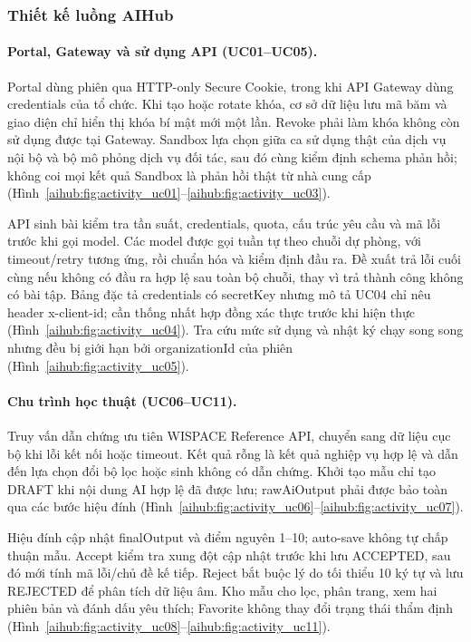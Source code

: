\subsubsection{Thiết kế luồng AIHub}

\paragraph{Portal, Gateway và sử dụng API (UC01--UC05).}
Portal dùng phiên qua HTTP-only Secure Cookie, trong khi API Gateway dùng credentials của tổ chức. Khi tạo hoặc rotate khóa, cơ sở dữ liệu lưu mã băm và giao diện chỉ hiển thị khóa bí mật mới một lần. Revoke phải làm khóa không còn sử dụng được tại Gateway. Sandbox lựa chọn giữa ca sử dụng thật của dịch vụ nội bộ và bộ mô phỏng dịch vụ đối tác, sau đó cùng kiểm định schema phản hồi; không coi mọi kết quả Sandbox là phản hồi thật từ nhà cung cấp (Hình~\ref{aihub:fig:activity_uc01}--\ref{aihub:fig:activity_uc03}).

API sinh bài kiểm tra tần suất, credentials, quota, cấu trúc yêu cầu và mã lỗi trước khi gọi model. Các model được gọi tuần tự theo chuỗi dự phòng, với timeout/retry tương ứng, rồi chuẩn hóa và kiểm định đầu ra. Đề xuất trả lỗi cuối cùng nếu không có đầu ra hợp lệ sau toàn bộ chuỗi, thay vì trả thành công không có bài tập. Bảng đặc tả credentials có secretKey nhưng mô tả UC04 chỉ nêu header x-client-id; cần thống nhất hợp đồng xác thực trước khi hiện thực (Hình~\ref{aihub:fig:activity_uc04}). Tra cứu mức sử dụng và nhật ký chạy song song nhưng đều bị giới hạn bởi organizationId của phiên (Hình~\ref{aihub:fig:activity_uc05}).

\paragraph{Chu trình học thuật (UC06--UC11).}
Truy vấn dẫn chứng ưu tiên WISPACE Reference API, chuyển sang dữ liệu cục bộ khi lỗi kết nối hoặc timeout. Kết quả rỗng là kết quả nghiệp vụ hợp lệ và dẫn đến lựa chọn đổi bộ lọc hoặc sinh không có dẫn chứng. Khởi tạo mẫu chỉ tạo DRAFT khi nội dung AI hợp lệ đã được lưu; rawAiOutput phải được bảo toàn qua các bước hiệu đính (Hình~\ref{aihub:fig:activity_uc06}--\ref{aihub:fig:activity_uc07}).

Hiệu đính cập nhật finalOutput và điểm nguyên 1--10; auto-save không tự chấp thuận mẫu. Accept kiểm tra xung đột cập nhật trước khi lưu ACCEPTED, sau đó mới tính mã lỗi/chủ đề kế tiếp. Reject bắt buộc lý do tối thiểu 10 ký tự và lưu REJECTED để phân tích dữ liệu âm. Kho mẫu cho lọc, phân trang, xem hai phiên bản và đánh dấu yêu thích; Favorite không thay đổi trạng thái thẩm định (Hình~\ref{aihub:fig:activity_uc08}--\ref{aihub:fig:activity_uc11}).

